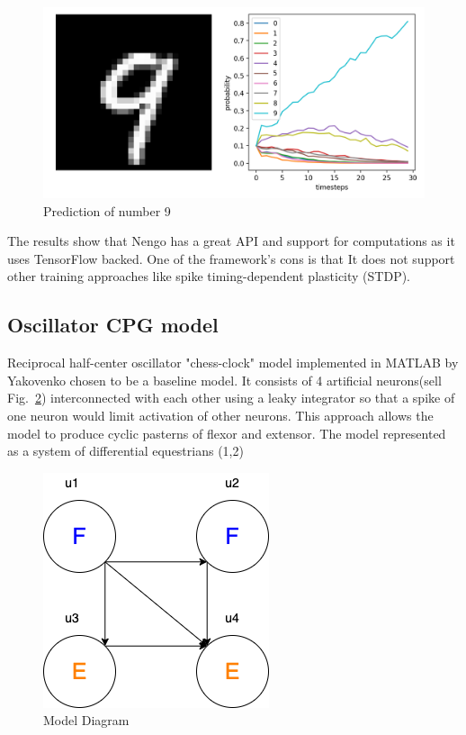 \documentclass[runningheads]{llncs}
\begin{document}
\begin{figure}
\includegraphics[width=\textwidth]{images/Figure_9.png}
\caption{Prediction of number 9} \label{fig4}
\end{figure}

The results show that Nengo has a great API and support for computations as it uses TensorFlow backed. One of the framework's cons is that It does not support other training approaches like spike timing-dependent plasticity (STDP).

\subsection{ Oscillator CPG model}
Reciprocal half-center oscillator "chess-clock" model implemented in MATLAB by Yakovenko\cite{ref27} chosen to be a baseline model. It consists of 4 artificial neurons(sell  Fig.~\ref{fig4}) interconnected with each other using a leaky integrator so that a spike of one neuron would limit activation of other neurons. This approach allows the model to produce cyclic pasterns of flexor and extensor. The model represented as a system of differential equestrians (1,2)

\begin{figure}
\centering
\includegraphics[scale=0.7]{images/model_diagram.png}
\caption{Model Diagram} \label{fig4}
\end{figure}
\end{document}
